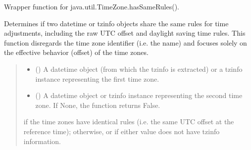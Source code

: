 \documentclass[letterpaper,10pt,english]{sphinxmanual}
\begin{document}
\begin{fulllineitems}
\label{\detokenize{apache_commons_validator_python.util:apache_commons_validator_python.util.datetime_helpers.timezone_has_same_rules}}
\pysigstartsignatures
{}
\pysigstopsignatures
\sphinxAtStartPar
Wrapper function for java.util.TimeZone.hasSameRules().

\sphinxAtStartPar
Determines if two datetime or tzinfo objects share the same rules for time adjustments,
including the raw UTC offset and daylight saving time rules. This function disregards the
time zone identifier (i.e. the name) and focuses solely on the effective behavior (offset)
of the time zones.
\begin{quote}\begin{description}
\begin{itemize}
\item {} 
\sphinxAtStartPar
{} (\sphinxstyleliteralemphasis{\sphinxupquote{{[}}}\sphinxstyleliteralemphasis{\sphinxupquote{, }}\sphinxstyleliteralemphasis{\sphinxupquote{{]}}}) \textendash{} A datetime object (from which the tzinfo is extracted)
or a tzinfo instance representing the first time zone.

\item {} 
\sphinxAtStartPar
{} (\sphinxstyleliteralemphasis{\sphinxupquote{{[}}}\sphinxstyleliteralemphasis{\sphinxupquote{, }}\sphinxstyleliteralemphasis{\sphinxupquote{, }}\sphinxstyleliteralemphasis{\sphinxupquote{{]}}}) \textendash{} A datetime object or tzinfo instance representing the
second time zone. If None, the function returns False.

\end{itemize}

\sphinxAtStartPar
{} if the time zones have identical rules (i.e. the same UTC offset at the reference time);
 otherwise, or if either value does not have tzinfo information.

\end{description}\end{quote}

\end{fulllineitems}
\end{document}
